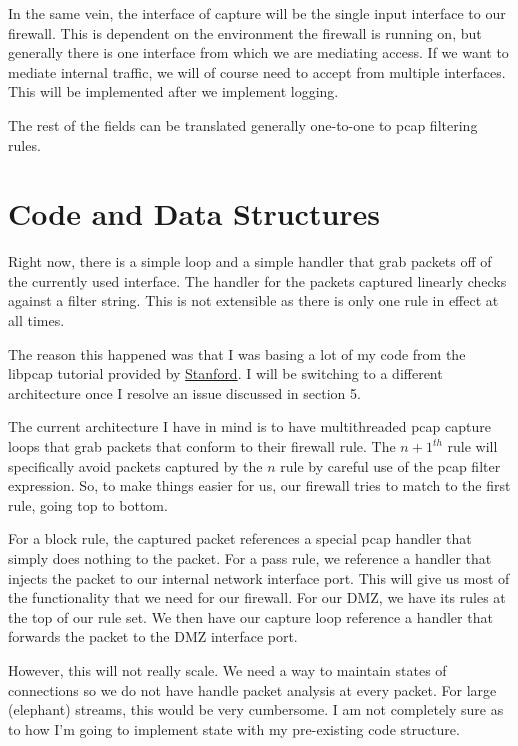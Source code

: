 \documentclass[12pt]{article}
\begin{document}
In the same vein, the interface of capture will be the single input 
interface to our firewall.
This is dependent on the environment the firewall is running on,
but generally there is one interface from which we are mediating access.
If we want to mediate internal traffic, we will of course need to 
accept from multiple interfaces. 
This will be implemented after we implement logging.

The rest of the fields can be translated generally one-to-one to pcap
filtering rules.

\section{Code and Data Structures}

Right now, there is a simple loop and a simple handler that grab packets off
of the currently used interface. 
The handler for the packets captured linearly checks against a filter string.
This is not extensible as there is only one rule in effect at all times. \par

The reason this happened was that I was basing a lot of my code from the
libpcap tutorial provided by
\href{http://yuba.stanford.edu/~casado/pcap/section3.html}{Stanford}.
I will be switching to a different architecture once I resolve an issue
discussed in section 5. \par

The current architecture I have in mind is to have multithreaded pcap capture
loops that grab packets that conform to their firewall rule.
The $n+1^{th}$ rule will specifically avoid packets captured by the $n$ rule
by careful use of the pcap filter expression. 
So, to make things easier for us, our firewall tries to match to the first 
rule, going top to bottom. \par

For a block rule, the captured packet references a special pcap handler that
simply does nothing to the packet.
For a pass rule, we reference a handler that injects the packet to our internal
network interface port.
This will give us most of the functionality that we need for our firewall.
For our DMZ, we have its rules at the top of our rule set.
We then have our capture loop reference a handler that forwards the packet
to the DMZ interface port. \par

However, this will not really scale.
We need a way to maintain states of connections so we do not have handle packet
analysis at every packet.
For large (elephant) streams, this would be very cumbersome.
I am not completely sure as to how I'm going to implement state with my 
pre-existing code structure. \par
\end{document}
